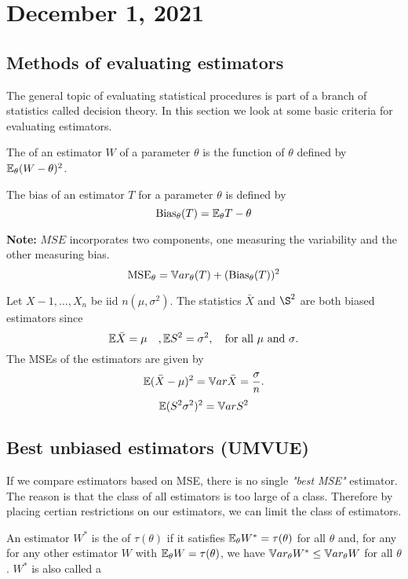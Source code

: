 \section{December 1, 2021}
\subsection{Methods of evaluating estimators}
The general topic of evaluating statistical procedures is part of a branch of statistics called decision theory. In this section we look at some basic criteria for evaluating estimators.
    
\begin{definition}
    The  of an estimator $W$ of a parameter $\theta$ is the function of $\theta$ defined by $\mathbb E_{\theta}(W-\theta)^2$.
\end{definition}

\begin{definition}[Bias]
    The bias of an estimator $T$ for a parameter $\theta$ is defined by 
    $$
    \text{Bias}_{\theta}(T) = \mathbb E_{\theta}T -\theta
    $$
\end{definition}
\textbf{Note:} $MSE$ incorporates two components, one measuring the variability and the other measuring bias.
$$
\text{MSE}_{\theta} = \mathbb V ar_{\theta}(T) + (\text{Bias}_{\theta}(T))^2
$$
\begin{example}
    Let $X-1,...,X_n$ be iid $n(\mu,\sigma^2)$. The statistics $\bar{X}$ and $\S^2$ are both biased estimators since
    $$
    \mathbb E \bar{X} = \mu \quad, \mathbb E S^2 = \sigma^2, \quad \text{for all $\mu$ and $\sigma$}.
    $$
    The MSEs of the estimators are given by
    $$
    \mathbb E(\bar{X} - \mu)^2 = \mathbb V ar \bar{X} = \frac{\sigma}{n}.
    $$
    $$
    \mathbb E(S^2 \sigma^2)^2 = \mathbb V ar S^2
    $$
\end{example}
\subsection{Best unbiased estimators (UMVUE)}
If we compare estimators based on MSE, there is no single \textit{"best MSE"} estimator. The reason is that the class of all estimators is too large of a class. Therefore by placing certian restrictions on our estimators, we can limit the class of estimators.  
\begin{definition}
    An estimator $W^*$ is the  of $\tau(\theta)$ if it satisfies $\mathbb E_{\theta}W^* = \tau(\theta)$ for all $\theta$ and, for any for any other estimator $W$ with $\mathbb E_{\theta}W = \tau(\theta)$, we have $\mathbb V ar_{\theta}W^* \leq \mathbb V ar_{\theta} W$ for all $\theta$. $W^*$ is also called a 
\end{definition}